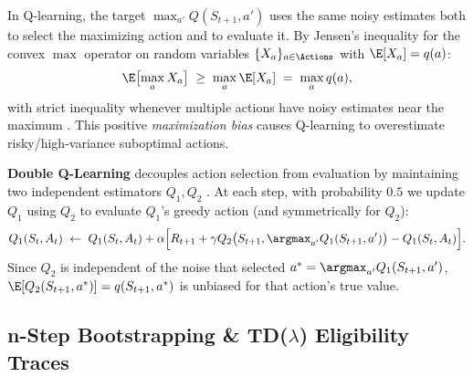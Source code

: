 \documentclass[../../../../master.tex]{subfiles}
\begin{document}
\begin{coremath}
In Q-learning, the target $\max_{a'} Q(S_{t+1}, a')$ uses the same noisy estimates both to select the maximizing action and to evaluate it. By Jensen's inequality for the convex $\max$ operator on random variables $\{X_a\}_{a \in \Actions}$ with $\E[X_a] = q(a)$:
\begin{equation}
  \E\bigl[\max_{a} X_a\bigr] \;\ge\; \max_{a} \E[X_a] \;=\; \max_{a} q(a),
\end{equation}
with strict inequality whenever multiple actions have noisy estimates near the maximum  . This positive \emph{maximization bias} causes Q-learning to overestimate risky/high-variance suboptimal actions.

\textbf{Double Q-Learning} decouples action selection from evaluation by maintaining two independent estimators $Q_1, Q_2$  . At each step, with probability $0.5$ we update $Q_1$ using $Q_2$ to evaluate $Q_1$'s greedy action (and symmetrically for $Q_2$):
\begin{equation}
  Q_1(S_t, A_t) \;\leftarrow\; Q_1(S_t, A_t) + \alpha \Bigl[ R_{t+1} + \gamma Q_2\bigl(S_{t+1}, \argmax_{a'} Q_1(S_{t+1}, a')\bigr) - Q_1(S_t, A_t) \Bigr].
  \label{eq:td:double_q}
\end{equation}
Since $Q_2$ is independent of the noise that selected $a^* = \argmax_{a'} Q_1(S_{t+1}, a')$, $\E[Q_2(S_{t+1}, a^*)] = q(S_{t+1}, a^*)$ is unbiased for that action's true value.
\end{coremath}


\subsection{n-Step Bootstrapping \& TD($\lambda$) Eligibility Traces}
\end{document}
